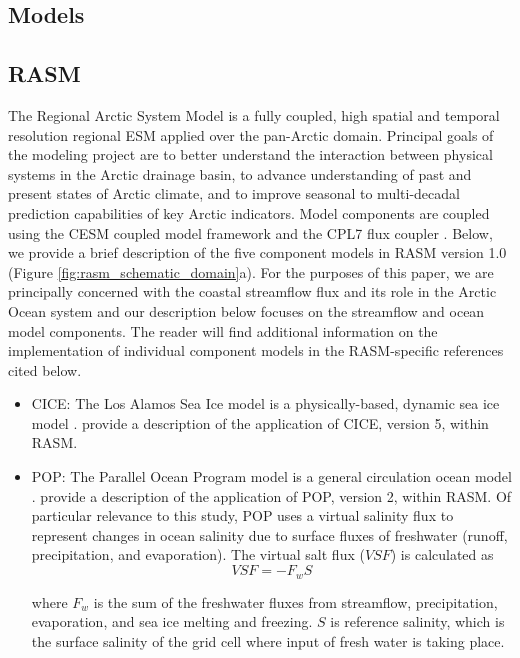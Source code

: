 \documentclass[jgrga, draft]{agutex}
\begin{document}
\begin{article}
\section{Models}
\label{sec:models}

\subsection{RASM}
\label{sec:rasm}
The Regional Arctic System Model is a fully coupled, high spatial and temporal resolution regional ESM applied over the pan-Arctic domain.
Principal goals of the modeling project are to better understand the interaction between physical systems in the Arctic drainage basin, to advance understanding of past and present states of Arctic climate, and to improve seasonal to multi-decadal prediction capabilities of key Arctic indicators.
Model components are coupled using the CESM coupled model framework and the CPL7 flux coupler \citep{Craig_2011}.
Below, we provide a brief description of the five component models in RASM version 1.0 (Figure \ref{fig:rasm_schematic_domain}a).
For the purposes of this paper, we are principally concerned with the coastal streamflow flux and its role in the Arctic Ocean system and our description below  focuses on the streamflow and ocean model components.
The reader will find additional information on the implementation of individual component models in the RASM-specific references cited below.

\begin{itemize}[leftmargin=+.5in]
\item CICE: The Los Alamos Sea Ice model is a physically-based, dynamic sea ice model \citep{Hunke_2010}.
\citet{Roberts_2015a} provide a description of the application of CICE, version 5, within RASM.
\item POP: The Parallel Ocean Program model is a general circulation ocean model \citep{Smith_2010}.
\citet{Roberts_2015a} provide a description of the application of POP, version 2, within RASM.
Of particular relevance to this study, POP uses a virtual salinity flux to represent changes in ocean salinity due to surface fluxes of freshwater (runoff, precipitation, and evaporation).
The virtual salt flux ($VSF$) is calculated as
\begin{equation}
  \label{eq:SaltFlux}
  VSF= -F_w S
\end{equation}

where $F_w$ is the sum of the freshwater fluxes from streamflow, precipitation, evaporation, and sea ice melting and freezing. $S$ is reference salinity, which is the surface salinity of the grid cell where input of fresh water is taking place. %


\end{itemize}
\end{article}
\end{document}
